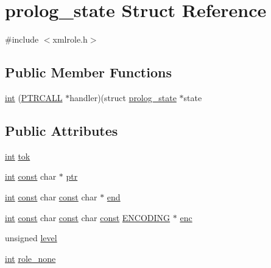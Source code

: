 \hypertarget{structprolog__state}{}\section{prolog\+\_\+state Struct Reference}
\label{structprolog__state}


{\ttfamily \#include $<$xmlrole.\+h$>$}

\subsection*{Public Member Functions}
\begin{DoxyCompactItemize}
\item 
\hyperlink{structprolog__state_aa5eb5916251da455f404f6acff21225a}{int} (\hyperlink{expat_2lib_2internal_8h_af44f68911377fd55f6e1588b0c89b3e5}{P\+T\+R\+C\+A\+LL} $\ast$handler)(struct \hyperlink{structprolog__state}{prolog\+\_\+state} $\ast$state
\end{DoxyCompactItemize}
\subsection*{Public Attributes}
\begin{DoxyCompactItemize}
\item 
\hyperlink{structprolog__state_aa5eb5916251da455f404f6acff21225a}{int} \hyperlink{structprolog__state_ac4af903bc6d08bf5945abf850aee2a67}{tok}
\item 
\hyperlink{structprolog__state_aa5eb5916251da455f404f6acff21225a}{int} \hyperlink{getopt1_8c_a2c212835823e3c54a8ab6d95c652660e}{const} char $\ast$ \hyperlink{structprolog__state_acc32115fc74ba5f3fd3e721670466a15}{ptr}
\item 
\hyperlink{structprolog__state_aa5eb5916251da455f404f6acff21225a}{int} \hyperlink{getopt1_8c_a2c212835823e3c54a8ab6d95c652660e}{const} char \hyperlink{getopt1_8c_a2c212835823e3c54a8ab6d95c652660e}{const} char $\ast$ \hyperlink{structprolog__state_a038b72ee34bd681594ee9ecc3e2263b8}{end}
\item 
\hyperlink{structprolog__state_aa5eb5916251da455f404f6acff21225a}{int} \hyperlink{getopt1_8c_a2c212835823e3c54a8ab6d95c652660e}{const} char \hyperlink{getopt1_8c_a2c212835823e3c54a8ab6d95c652660e}{const} char \hyperlink{getopt1_8c_a2c212835823e3c54a8ab6d95c652660e}{const} \hyperlink{xmltok_8h_a46834e73898ebab478b38f817a8c6fc0}{E\+N\+C\+O\+D\+I\+NG} $\ast$ \hyperlink{structprolog__state_a7e8562ff36e1a1051fa703ca6f80228e}{enc}
\item 
unsigned \hyperlink{structprolog__state_a9bc6e108c8efd3bc37d42feb18eb8c6b}{level}
\item 
\hyperlink{structprolog__state_aa5eb5916251da455f404f6acff21225a}{int} \hyperlink{structprolog__state_aeba13f636dda0ee3f274a81fd865e223}{role\+\_\+none}
\end{DoxyCompactItemize}


